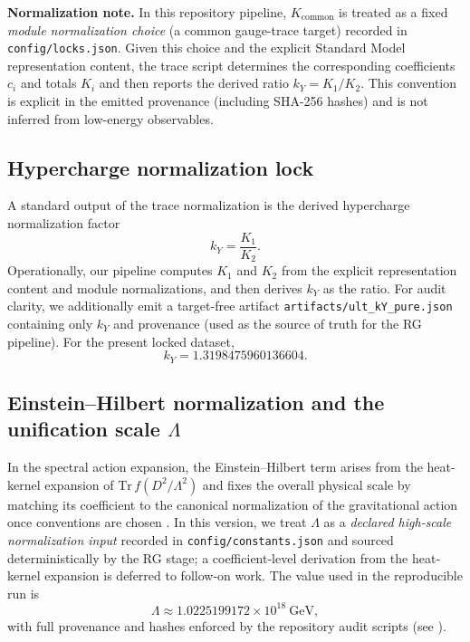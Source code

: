 \documentclass[11pt]{article}
\begin{document}
\noindent\textbf{Normalization note.}
In this repository pipeline, $K_{\mathrm{common}}$ is treated as a fixed \emph{module normalization choice} (a common gauge-trace target) recorded in \texttt{config/locks.json}. Given this choice and the explicit Standard Model representation content, the trace script determines the corresponding coefficients $c_i$ and totals $K_i$ and then reports the derived ratio $k_Y=K_1/K_2$. This convention is explicit in the emitted provenance (including SHA-256 hashes) and is not inferred from low-energy observables.

\subsection{Hypercharge normalization lock}
A standard output of the trace normalization is the derived hypercharge normalization factor
\begin{equation}
k_Y = \frac{K_1}{K_2}.
\end{equation}
Operationally, our pipeline computes $K_1$ and $K_2$ from the explicit representation content and module normalizations, and then derives $k_Y$ as the ratio. For audit clarity, we additionally emit a target-free artifact \texttt{artifacts/ult\_kY\_pure.json} containing only $k_Y$ and provenance (used as the source of truth for the RG pipeline). For the present locked dataset,
\begin{equation}
k_Y = 1.3198475960136604.
\end{equation}

\subsection{Einstein--Hilbert normalization and the unification scale \texorpdfstring{$\Lambda$}{Lambda}}
In the spectral action expansion, the Einstein--Hilbert term arises from the heat-kernel expansion of $\mathrm{Tr}\,f(D^2/\Lambda^2)$ and fixes the overall physical scale by matching its coefficient to the canonical normalization of the gravitational action once conventions are chosen \cite{ChamseddineConnes1996,ChamseddineConnes1997}. In this version, we treat $\Lambda$ as a \emph{declared high-scale normalization input} recorded in \texttt{config/constants.json} and sourced deterministically by the RG stage; a coefficient-level derivation from the heat-kernel expansion is deferred to follow-on work. The value used in the reproducible run is
\begin{equation}
\Lambda \approx 1.0225199172\times 10^{18}\ \mathrm{GeV},
\end{equation}
with full provenance and hashes enforced by the repository audit scripts (see \texttt{}).
\end{document}
